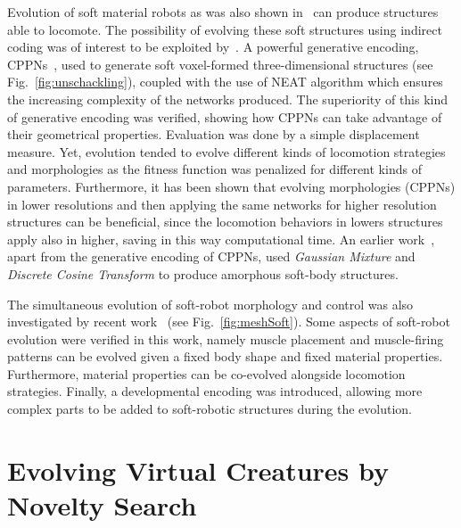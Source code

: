 Evolution of soft material robots as was also shown in~\citep{hiller2012automatic} can produce structures able to locomote. The possibility of evolving these soft structures using indirect coding was of interest to be exploited by~\citep{cheney2013unshackling}. A powerful generative encoding, CPPNs~\citep{stanley2007compositional}, used to generate soft voxel-formed three-dimensional structures (see Fig.~\ref{fig:unschackling}), coupled with the use of NEAT algorithm which ensures the increasing complexity of the networks produced. The superiority of this kind of generative encoding was verified, showing how CPPNs can take advantage of their geometrical properties. Evaluation was done by a simple displacement measure. Yet, evolution tended to evolve different kinds of locomotion strategies and morphologies as the fitness function was penalized for different kinds of parameters. Furthermore, it has been shown that evolving morphologies (CPPNs) in lower resolutions and then applying the same networks for higher resolution structures can be beneficial, since the locomotion behaviors in lowers structures apply also in higher, saving in this way computational time.  An earlier work~\citep{hiller2010evolving}, apart from the generative encoding of CPPNs, used \textit{Gaussian Mixture} and \textit{Discrete Cosine Transform} to produce amorphous soft-body structures.

The simultaneous evolution of soft-robot morphology and control was also investigated by recent work~\citep{rieffel2014growing} (see Fig.~\ref{fig:meshSoft}). Some aspects of soft-robot evolution were verified in this work, namely muscle placement and muscle-firing patterns can be evolved given a fixed body shape and fixed material properties. Furthermore, material properties can be co-evolved alongside locomotion strategies. Finally, a developmental encoding was introduced, allowing more complex parts to be added to soft-robotic structures during the evolution.


\section{Evolving Virtual Creatures by Novelty Search}

